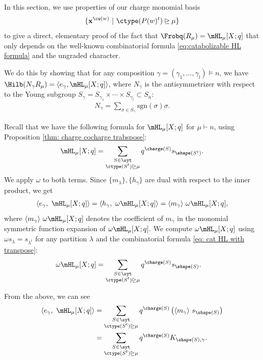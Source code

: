 In this section, we use properties of our charge monomial basis \[\{\mathbf{x}^{\cw(w)} \ | \ \ctype(P(w)^t)\unrhd \mu\}\] to give a direct, elementary proof of the fact that $\Frobq (R_{\mu}) = \mHL_{\mu}[X;q]$ that only depends on the well-known combinatorial formula \eqref{eq:catabolizable HL formula} and the ungraded character.

We do this by showing that for any composition $\gamma = (\gamma_1,\dots, \gamma_l)\models n$, we have $\Hilb(N_\gamma R_{\mu}) = \langle e_\gamma , \mHL_{\mu}[X;q]\rangle$, where $N_\gamma$ is the antisymmetrizer with respect to the Young subgroup $S_\gamma = S_{\gamma_1}\times \cdots\times  S_{\gamma_l} \subset S_n$:  
\begin{align*}
    N_\gamma = \sum\limits_{\sigma\in S_\gamma} \text{sgn}(\sigma)\sigma.
\end{align*}

Recall that we have the following formula for  $\mHL_{\mu}[X;q]$ for $\mu\vdash n$, using Proposition \ref{thm: charge cocharge trabspose}:
\begin{align}\label{eq: cat HL with transpose}
\mHL_{\mu}[X;q] =  \sum\limits_{\substack{S\in \syt\\  \ctype(S^t)\unrhd\mu}}  q^{\charge(S)} s_{\shape(S^t)}.
\end{align}
We apply $\omega$ to both terms. Since $\{m_\lambda\}, \{h_\gamma\}$ are dual with respect to the inner product, we get
\begin{align*}
     \langle e_{\gamma},\  \mHL_{\mu}  [X;q] \rangle =  \langle h_{\gamma},\  \omega \mHL_{\mu} [X;q] \rangle = \langle m_\gamma\rangle  \ \omega \mHL_{\mu} [X;q] , 
\end{align*}
where $\langle m_\gamma\rangle  \ \omega \mHL_{\mu} [X;q] $ denotes the coefficient of $m_\gamma$ in the monomial symmetric function expansion of $\omega \mHL_{\mu} [X;q] $.
We compute $\omega \mHL_{\mu} [X;q] $ using $\omega s_\lambda = s_{\lambda^t}$ for any partition $\lambda$ and the combinatorial formula \eqref{eq: cat HL with transpose}:
\begin{align*}
    \omega \mHL_{\mu} [X;q]   &= \sum\limits_{\substack{S\in \syt\\  \ctype(S^t)\unrhd\mu}}  q^{\charge(S)}s_{\shape(S)}  .
\end{align*}

From the above, we can see
\begin{align*}
    \langle e_{\gamma},\  \mHL_{\mu}  [X;q] \rangle &=  \sum\limits_{\substack{S \in \syt\\  \ctype(S^t)\unrhd\mu}}  q^{\charge(S)} \left(\langle m_\gamma \rangle \   s_{\shape(S)} \right) \\&= \sum\limits_{\substack{S\in \syt\\  \ctype(S^t)\unrhd\mu}}  q^{\charge(S)}   K_{\shape(S),\gamma}.
\end{align*}

